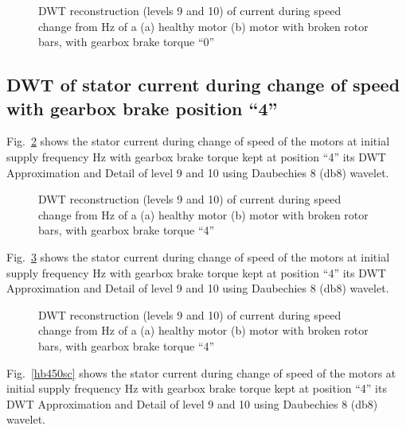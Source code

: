 \documentclass[a4paper,11pt]{report}
\begin{document}
\begin{figure}[h]
\centering
\subfigure[]{\texttt{[image: h050sc]}}
\subfigure[]{\texttt{[image: b050sc]}}
\caption{DWT reconstruction (levels 9 and 10) of current during speed change from \unit[50]{Hz} of a (a) healthy motor (b) motor with broken rotor bars, with gearbox brake torque ``0''} \label{hb050sc}
\end{figure}

\clearpage
\subsection{DWT of stator current during change of speed with gearbox brake position ``4''}

Fig.~\ref{hb430sc} shows the stator current during change of speed of the motors at initial supply frequency \unit[30]{Hz} with gearbox brake torque kept at position ``4'' its DWT Approximation and Detail of level 9 and 10 using Daubechies 8 (db8) wavelet.

\begin{figure}[h]
\centering
\subfigure[]{\texttt{[image: h430sc]}}
\subfigure[]{\texttt{[image: b430sc]}}
\caption{DWT reconstruction (levels 9 and 10) of current during speed change from \unit[30]{Hz} of a (a) healthy motor (b) motor with broken rotor bars, with gearbox brake torque ``4''} \label{hb430sc}
\end{figure}

\clearpage
Fig.~\ref{hb440sc} shows the stator current during change of speed of the motors at initial supply frequency \unit[40]{Hz} with gearbox brake torque kept at position ``4'' its DWT Approximation and Detail of level 9 and 10 using Daubechies 8 (db8) wavelet.

\begin{figure}[h]
\centering
\subfigure[]{\texttt{[image: h440sc]}}
\subfigure[]{\texttt{[image: b440sc]}}
\caption{DWT reconstruction (levels 9 and 10) of current during speed change from \unit[40]{Hz} of a (a) healthy motor (b) motor with broken rotor bars, with gearbox brake torque ``4''} \label{hb440sc}
\end{figure}

\clearpage
Fig.~\ref{hb450sc} shows the stator current during change of speed of the motors at initial supply frequency \unit[50]{Hz} with gearbox brake torque kept at position ``4'' its DWT Approximation and Detail of level 9 and 10 using Daubechies 8 (db8) wavelet.
\end{document}
